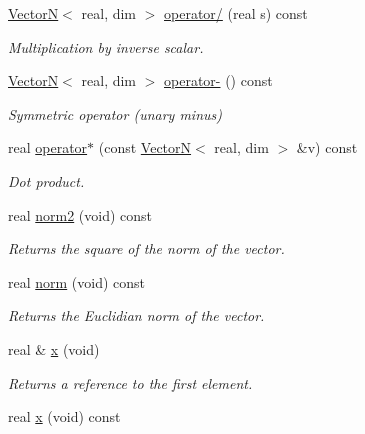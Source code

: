 \begin{DoxyCompactItemize}
\hyperlink{classVectorN}{VectorN}$<$ real, dim $>$ \hyperlink{classVectorN_aca314d985163785e68d412a2e73fd50c}{operator/} (real s) const 
\begin{DoxyCompactList}\small\item\em Multiplication by inverse scalar. \end{DoxyCompactList}\item 
\hyperlink{classVectorN}{VectorN}$<$ real, dim $>$ \hyperlink{classVectorN_a200e8f7a82d7681232ac18fcbd746f29}{operator-\/} () const 
\begin{DoxyCompactList}\small\item\em Symmetric operator (unary minus) \end{DoxyCompactList}\item 
real \hyperlink{classVectorN_ac969f8b5e56b59d5aef32bcde365bf24}{operator$\ast$} (const \hyperlink{classVectorN}{VectorN}$<$ real, dim $>$ \&v) const 
\begin{DoxyCompactList}\small\item\em Dot product. \end{DoxyCompactList}\item 
\hypertarget{classVectorN_abab02b195f9f65fe10b28299e5a8ccd8}{
real \hyperlink{classVectorN_abab02b195f9f65fe10b28299e5a8ccd8}{norm2} (void) const }
\label{classVectorN_abab02b195f9f65fe10b28299e5a8ccd8}

\begin{DoxyCompactList}\small\item\em Returns the square of the norm of the vector. \end{DoxyCompactList}\item 
\hypertarget{classVectorN_ae40fe34821f326f9c8ebe862c685b2b3}{
real \hyperlink{classVectorN_ae40fe34821f326f9c8ebe862c685b2b3}{norm} (void) const }
\label{classVectorN_ae40fe34821f326f9c8ebe862c685b2b3}

\begin{DoxyCompactList}\small\item\em Returns the Euclidian norm of the vector. \end{DoxyCompactList}\item 
\hypertarget{classVectorN_af6be6194bee3d68ab71217cb83639bdc}{
real \& \hyperlink{classVectorN_af6be6194bee3d68ab71217cb83639bdc}{x} (void)}
\label{classVectorN_af6be6194bee3d68ab71217cb83639bdc}

\begin{DoxyCompactList}\small\item\em Returns a reference to the first element. \end{DoxyCompactList}\item 
\hypertarget{classVectorN_adf0a31d3c269331b655ae7eba1e3f828}{
real \hyperlink{classVectorN_adf0a31d3c269331b655ae7eba1e3f828}{x} (void) const }
\label{classVectorN_adf0a31d3c269331b655ae7eba1e3f828}


\end{DoxyCompactItemize}
